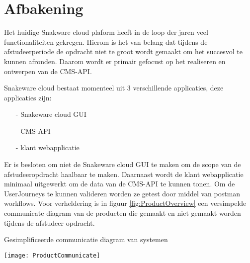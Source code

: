 \section{Afbakening}
%
%
Het huidige Snakware cloud plaform heeft in de loop der jaren veel functionaliteiten gekregen.
Hierom is het van belang dat tijdens de afstudeerperiode de opdracht niet te groot wordt gemaakt om het succesvol te kunnen afronden.
Daarom wordt er primair gefocust op het realiseren en ontwerpen van de CMS-API.

\whitespace[2]
Snakeware cloud bestaat momenteel uit 3 verschillende applicaties, deze applicaties zijn:
\begin{itemize}
    \item[-] Snakeware cloud \gls{GUI}  
    \item[-] CMS-API
    \item[-] klant webapplicatie
\end{itemize}

\whitespace[2]
Er is besloten om niet de Snakeware cloud \gls{GUI} te maken om de scope van de afstudeeropdracht haalbaar te maken.
Daarnaast wordt de klant webapplicatie minimaal uitgewerkt om de data van de CMS-API te kunnen tonen.
Om de \gls{UserJourneys} te kunnen valideren worden ze getest door middel van postman workflows.
Voor verheldering is in figuur \ref{fig:ProductOverview} een versimpelde communicate diagram van de producten die gemaakt en niet gemaakt worden tijdens de afstudeer opdracht.\\
\begin{graphic}
    \vspace{0.2cm}
    \captionsetup{type=figure}
    \caption{Gesimplificeerde communicatie diagram van  systemen}
    \texttt{[image: ProductCommunicate]}
    \label{fig:ProductOverview}
    \vspace{0.2cm}
\end{graphic}
